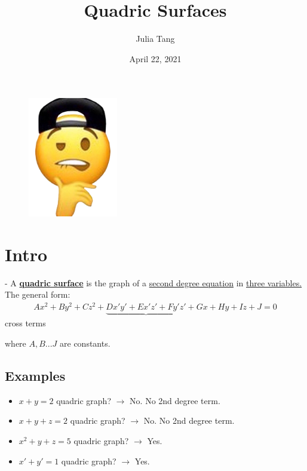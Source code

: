\documentclass{article}
\title{\textbf{Quadric Surfaces}}
\author{Julia Tang}
\date{April 22, 2021}
\begin{document}


\maketitle
\begin{figure}[H]
  \begin{center}
    \includegraphics[width=0.35\textwidth]{lip bite.png}
  \end{center}
\end{figure}
\newpage

\doublespacing
\tableofcontents
\singlespacing

\newpage
\section{Intro}

- A \underline{\textbf{quadric surface}} is the graph of a \underline{second degree equation} in \underline{three variables.} The general form:
\begin{align*}
  Ax^2+By^2+Cz^2+\underbrace{Dx'y'+Ex'z'+Fy'z'}+Gx+Hy+Iz+J=0
\end{align*}
\hspace{7cm}cross terms

where $A,B... J$ are constants.

\subsection{Examples}
\begin{itemize}
  \item $x+y=2$ quadric graph? $\rightarrow$ No. No 2nd degree term.
  \item $x+y+z=2$ quadric graph? $\rightarrow$ No. No 2nd degree term.
  \item $x^2+y+z=5$ quadric graph? $\rightarrow$ Yes.
  \item $x'+y'=1$ quadric graph? $\rightarrow$ Yes.
\end{itemize}
\end{document}
